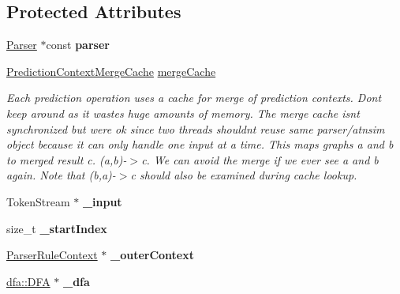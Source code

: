 \subsection*{Protected Attributes}
\begin{DoxyCompactItemize}
\item 
\mbox{\label{classantlr4_1_1atn_1_1ParserATNSimulator_ad4351ce091415097bb205d647cecfb86}} 
\hyperlink{classantlr4_1_1Parser}{Parser} $\ast$const {\bfseries parser}
\item 
\hyperlink{classantlr4_1_1atn_1_1PredictionContextMergeCache}{Prediction\+Context\+Merge\+Cache} \hyperlink{classantlr4_1_1atn_1_1ParserATNSimulator_aa4d885910cc6f113c761a232d297e8e4}{merge\+Cache}
\begin{DoxyCompactList}\small\item\em Each prediction operation uses a cache for merge of prediction contexts. Don\textquotesingle{}t keep around as it wastes huge amounts of memory. The merge cache isn\textquotesingle{}t synchronized but we\textquotesingle{}re ok since two threads shouldn\textquotesingle{}t reuse same parser/atnsim object because it can only handle one input at a time. This maps graphs a and b to merged result c. (a,b)-\/$>$c. We can avoid the merge if we ever see a and b again. Note that (b,a)-\/$>$c should also be examined during cache lookup. \end{DoxyCompactList}\item 
\mbox{\label{classantlr4_1_1atn_1_1ParserATNSimulator_a823106102e611d8c746145640956c34f}} 
Token\+Stream $\ast$ {\bfseries \+\_\+input}
\item 
\mbox{\label{classantlr4_1_1atn_1_1ParserATNSimulator_ad970329e7a96edbc93ce38604608f0b2}} 
size\+\_\+t {\bfseries \+\_\+start\+Index}
\item 
\mbox{\label{classantlr4_1_1atn_1_1ParserATNSimulator_ad32cd2d2a9fdee36456898fba307f03b}} 
\hyperlink{classantlr4_1_1ParserRuleContext}{Parser\+Rule\+Context} $\ast$ {\bfseries \+\_\+outer\+Context}
\item 
\mbox{\label{classantlr4_1_1atn_1_1ParserATNSimulator_aa4900c86546ea8b582b5ebb935c142d8}} 
\hyperlink{classantlr4_1_1dfa_1_1DFA}{dfa\+::\+D\+FA} $\ast$ {\bfseries \+\_\+dfa}
\end{DoxyCompactItemize}
